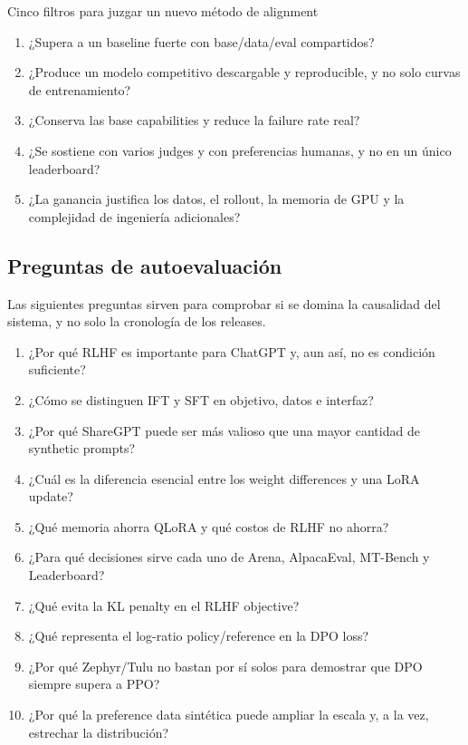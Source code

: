 \begin{importantbox}{Cinco filtros para juzgar un nuevo método de alignment}
\begin{enumerate}
  \item ¿Supera a un baseline fuerte con base/data/eval compartidos?
  \item ¿Produce un modelo competitivo descargable y reproducible, y no solo curvas de entrenamiento?
  \item ¿Conserva las base capabilities y reduce la failure rate real?
  \item ¿Se sostiene con varios judges y con preferencias humanas, y no en un único leaderboard?
  \item ¿La ganancia justifica los datos, el rollout, la memoria de GPU y la complejidad de ingeniería adicionales?
\end{enumerate}
\end{importantbox}

\subsection{Preguntas de autoevaluación}

Las siguientes preguntas sirven para comprobar si se domina la causalidad del sistema, y no solo la cronología de los releases.

\begin{enumerate}
  \item ¿Por qué RLHF es importante para ChatGPT y, aun así, no es condición suficiente?
  \item ¿Cómo se distinguen IFT y SFT en objetivo, datos e interfaz?
  \item ¿Por qué ShareGPT puede ser más valioso que una mayor cantidad de synthetic prompts?
  \item ¿Cuál es la diferencia esencial entre los weight differences y una LoRA update?
  \item ¿Qué memoria ahorra QLoRA y qué costos de RLHF no ahorra?
  \item ¿Para qué decisiones sirve cada uno de Arena, AlpacaEval, MT-Bench y Leaderboard?
  \item ¿Qué evita la KL penalty en el RLHF objective?
  \item ¿Qué representa el log-ratio policy/reference en la DPO loss?
  \item ¿Por qué Zephyr/Tulu no bastan por sí solos para demostrar que DPO siempre supera a PPO?
  \item ¿Por qué la preference data sintética puede ampliar la escala y, a la vez, estrechar la distribución?
\end{enumerate}


